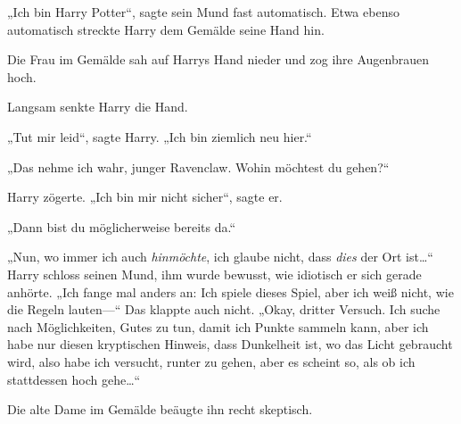 „Ich bin Harry Potter“, sagte sein Mund fast automatisch. Etwa ebenso automatisch streckte Harry dem Gemälde seine Hand hin.

Die Frau im Gemälde sah auf Harrys Hand nieder und zog ihre Augenbrauen hoch.

Langsam senkte Harry die Hand.

„Tut mir leid“, sagte Harry. „Ich bin ziemlich neu hier.“

„Das nehme ich wahr, junger Ravenclaw. Wohin möchtest du gehen?“

Harry zögerte. „Ich bin mir nicht sicher“, sagte er.

„Dann bist du möglicherweise bereits da.“

„Nun, wo immer ich auch \emph{hinmöchte}, ich glaube nicht, dass \emph{dies} der Ort ist…“ Harry schloss seinen Mund, ihm wurde bewusst, wie idiotisch er sich gerade anhörte. „Ich fange mal anders an: Ich spiele dieses Spiel, aber ich weiß nicht, wie die Regeln lauten—“ Das klappte auch nicht. „Okay, dritter Versuch. Ich suche nach Möglichkeiten, Gutes zu tun, damit ich Punkte sammeln kann, aber ich habe nur diesen kryptischen Hinweis, dass Dunkelheit ist, wo das Licht gebraucht wird, also habe ich versucht, runter zu gehen, aber es scheint so, als ob ich stattdessen hoch gehe…“%

Die alte Dame im Gemälde beäugte ihn recht skeptisch.


